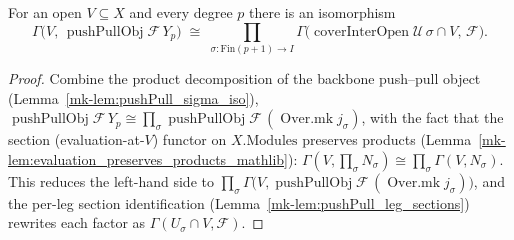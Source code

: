 \begin{lemma}\label{mk-lem:pushPull_eval_prod_iso}
  \leanok

  For an open \(V \subseteq X\) and every degree \(p\) there is an isomorphism
  \[
    \Gamma\bigl(V,\, \operatorname{pushPullObj}\mathcal{F}\,Y_p\bigr)
      \;\cong\;
    \prod_{\sigma : \mathrm{Fin}(p+1) \to I}
      \Gamma\bigl(\operatorname{coverInterOpen}\mathcal{U}\,\sigma \cap V,\, \mathcal{F}\bigr).
  \]
\end{lemma}
\begin{proof}
  Combine the product decomposition of the backbone push--pull object
  (Lemma~\ref{mk-lem:pushPull_sigma_iso}), \(\operatorname{pushPullObj}\mathcal{F}\,Y_p \cong
  \prod_\sigma \operatorname{pushPullObj}\mathcal{F}\,(\operatorname{Over.mk} j_\sigma)\),
  with the fact that the section (evaluation-at-\(V\)) functor on \(X.\mathrm{Modules}\)
  preserves products (Lemma~\ref{mk-lem:evaluation_preserves_products_mathlib}): \(\Gamma(V,
  \prod_\sigma N_\sigma) \cong \prod_\sigma \Gamma(V, N_\sigma)\). This reduces the
  left-hand side to \(\prod_\sigma \Gamma\bigl(V, \operatorname{pushPullObj}\mathcal{F}\,
  (\operatorname{Over.mk} j_\sigma)\bigr)\), and the per-leg section identification
  (Lemma~\ref{mk-lem:pushPull_leg_sections}) rewrites each factor as \(\Gamma(U_\sigma \cap V,
  \mathcal{F})\).
\end{proof}

